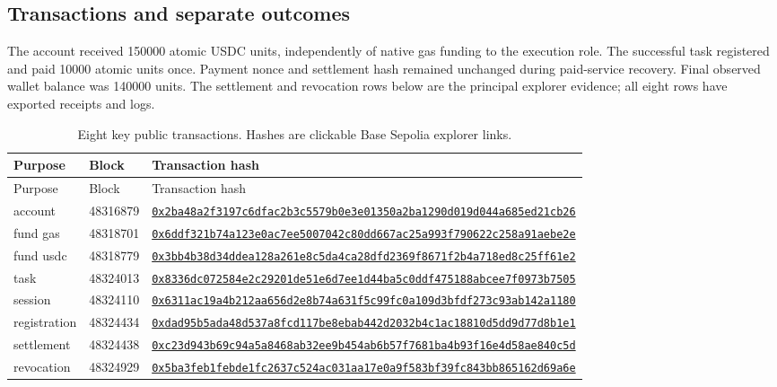 \subsection{Transactions and separate outcomes}
The account received 150000 atomic USDC units, independently of native gas funding to the execution role. The successful task registered and paid 10000 atomic units once. Payment nonce  and settlement hash remained unchanged during paid-service recovery. Final observed wallet balance was 140000 units. The settlement and revocation rows below are the principal explorer evidence; all eight rows have exported receipts and logs.
\begin{longtable}{L{2.2cm}L{2.1cm}L{10.4cm}}\caption{Eight key public transactions. Hashes are clickable Base Sepolia explorer links.}\label{tab:transactions}\\\toprule Purpose & Block & Transaction hash\\\midrule\endfirsthead\toprule Purpose & Block & Transaction hash\\\midrule\endhead
account & 48316879 & \href{https://sepolia.basescan.org/tx/0x2ba48a2f3197c6dfac2b3c5579b0e3e01350a2ba1290d019d044a685ed21cb26}{\nolinkurl{0x2ba48a2f3197c6dfac2b3c5579b0e3e01350a2ba1290d019d044a685ed21cb26}}\\
fund gas & 48318701 & \href{https://sepolia.basescan.org/tx/0x6ddf321b74a123e0ac7ee5007042c80dd667ac25a993f790622c258a91aebe2e}{\nolinkurl{0x6ddf321b74a123e0ac7ee5007042c80dd667ac25a993f790622c258a91aebe2e}}\\
fund usdc & 48318779 & \href{https://sepolia.basescan.org/tx/0x3bb4b38d34ddea128a261e8c5da4ca28dfd2369f8671f2b4a718ed8c25ff61e2}{\nolinkurl{0x3bb4b38d34ddea128a261e8c5da4ca28dfd2369f8671f2b4a718ed8c25ff61e2}}\\
task & 48324013 & \href{https://sepolia.basescan.org/tx/0x8336dc072584e2c29201de51e6d7ee1d44ba5c0ddf475188abcee7f0973b7505}{\nolinkurl{0x8336dc072584e2c29201de51e6d7ee1d44ba5c0ddf475188abcee7f0973b7505}}\\
session & 48324110 & \href{https://sepolia.basescan.org/tx/0x6311ac19a4b212aa656d2e8b74a631f5c99fc0a109d3bfdf273c93ab142a1180}{\nolinkurl{0x6311ac19a4b212aa656d2e8b74a631f5c99fc0a109d3bfdf273c93ab142a1180}}\\
registration & 48324434 & \href{https://sepolia.basescan.org/tx/0xdad95b5ada48d537a8fcd117be8ebab442d2032b4c1ac18810d5dd9d77d8b1e1}{\nolinkurl{0xdad95b5ada48d537a8fcd117be8ebab442d2032b4c1ac18810d5dd9d77d8b1e1}}\\
settlement & 48324438 & \href{https://sepolia.basescan.org/tx/0xc23d943b69c94a5a8468ab32ee9b454ab6b57f7681ba4b93f16e4d58ae840c5d}{\nolinkurl{0xc23d943b69c94a5a8468ab32ee9b454ab6b57f7681ba4b93f16e4d58ae840c5d}}\\
revocation & 48324929 & \href{https://sepolia.basescan.org/tx/0x5ba3feb1febde1fc2637c524ac031aa17e0a9f583bf39fc843bb865162d69a6e}{\nolinkurl{0x5ba3feb1febde1fc2637c524ac031aa17e0a9f583bf39fc843bb865162d69a6e}}\\
\bottomrule\end{longtable}

